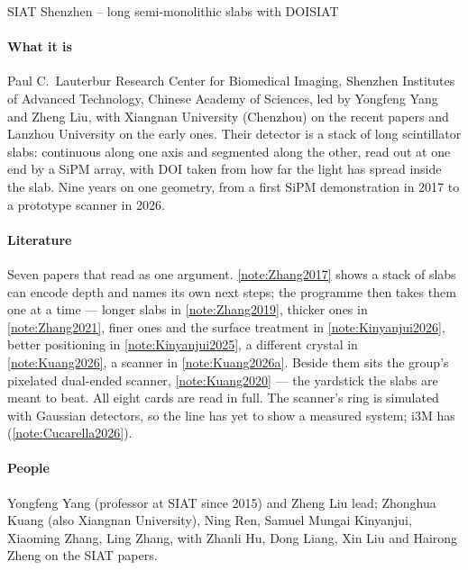 \begin{programnote}{SIAT Shenzhen -- long semi-monolithic slabs with DOI}{SIAT}

\paragraph{What it is}
Paul C.\ Lauterbur Research Center for Biomedical Imaging, Shenzhen Institutes
of Advanced Technology, Chinese Academy of Sciences, led by Yongfeng Yang and
Zheng Liu, with Xiangnan University (Chenzhou) on the recent papers and Lanzhou
University on the early ones. Their detector is a stack of long scintillator
slabs: continuous along one axis and segmented along the other, read out at one
end by a SiPM array, with DOI taken from how far the light has spread inside
the slab. Nine years on one geometry, from a first SiPM demonstration in 2017
to a prototype scanner in 2026.

\paragraph{Literature}
Seven papers that read as one argument. \ref{note:Zhang2017} shows a stack of
slabs can encode depth and names its own next steps; the programme then takes
them one at a time --- longer slabs in \ref{note:Zhang2019}, thicker ones in
\ref{note:Zhang2021}, finer ones and the surface treatment in
\ref{note:Kinyanjui2026}, better positioning in \ref{note:Kinyanjui2025}, a
different crystal in \ref{note:Kuang2026}, a scanner in
\ref{note:Kuang2026a}. Beside them sits the group's pixelated dual-ended
scanner, \ref{note:Kuang2020} --- the yardstick the slabs are meant to beat.
All eight cards are read in full. The scanner's ring is simulated with Gaussian
detectors, so the line has yet to show a measured system; i3M has
(\ref{note:Cucarella2026}).

\paragraph{People}
Yongfeng Yang (professor at SIAT since 2015) and Zheng Liu lead; Zhonghua Kuang
(also Xiangnan University), Ning Ren, Samuel Mungai Kinyanjui, Xiaoming Zhang,
Ling Zhang, with Zhanli Hu, Dong Liang, Xin Liu and Hairong Zheng on the SIAT
papers.


\end{programnote}

